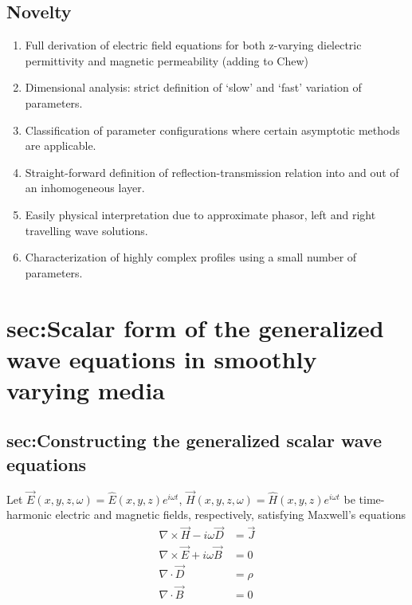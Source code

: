 \documentclass[twocolumn,secnumarabic,amssymb, nobibnotes, aps, prd]{revtex4-1}
\begin{document}
\subsection{Novelty}
\begin{enumerate}
\item Full derivation of electric field equations for both z-varying dielectric permittivity and magnetic permeability (adding to Chew)
\item Dimensional analysis: strict definition of `slow' and `fast' variation of parameters.
\item Classification of parameter configurations where certain asymptotic methods are applicable.
\item Straight-forward definition of reflection-transmission relation into and out of an inhomogeneous layer.
\item Easily physical interpretation due to approximate phasor, left and right travelling wave solutions.
\item Characterization of highly complex profiles using a small number of parameters.

\end{enumerate}





\section{sec:Scalar form of the generalized wave equations in smoothly varying media}
\subsection{sec:Constructing the generalized scalar wave equations}

Let $\overrightarrow{E}(x,y,z,\omega) = \hat{E}(x,y,z)e^{i \omega t}$, $\overrightarrow{H}(x,y,z,\omega) = \hat{H}(x,y,z)e^{i \omega t}$ be time-harmonic electric and magnetic fields, respectively, satisfying Maxwell's equations
\begin{subequations}

	\begin{align}
        \nabla \times \overrightarrow{H}-i \omega \overrightarrow{D} &= \overrightarrow{J}  \label{eqns:CurlH_Maxwell}	\\	
        \nabla \times \overrightarrow{E} + i \omega \overrightarrow{B} &= 0  \label{eqns:CurlE_Maxwell} \\
		\nabla \cdot \overrightarrow{D} &=  \rho	 \label{eqns:DivD_Maxwell}\\		
		\nabla \cdot \overrightarrow{B} &= 0	
	\end{align}
\end{subequations}
 
\end{document}
